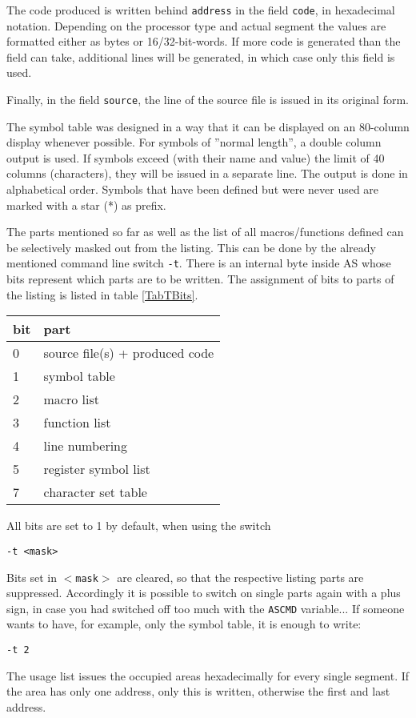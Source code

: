 \documentclass[12pt,twoside]{report}
\newcommand{\tty}[1]{{\tt #1}}
\newcommand{\asname}{{AS}}
\begin{document}
The code produced is written behind \tty{address} in the field \tty{code},
in hexadecimal notation. Depending on the processor type and actual
segment the values are formatted either as bytes or 16/32-bit-words.
If more code is generated than the field can take, additional lines
will be  generated, in which case only this field is used.

Finally, in the field \tty{source}, the line of the source file is issued in
its original form.

The symbol table was designed in a way that it can be displayed on an
80-column display whenever possible. For symbols of ''normal length'',
a double column output is used.  If symbols exceed (with their name
and value) the limit of 40 columns (characters), they will be issued
in a separate line. The output is done in alphabetical order.
Symbols that have been defined but were never used are marked with a
star (*) as prefix.

The parts mentioned so far as well as the list of all macros/functions
defined can be selectively masked out from the listing.
This can be done by the already mentioned command line switch \tty{-t}.
There is an internal byte inside \asname{} whose bits represent which parts
are to be written.  The assignment of bits to parts of the listing is
listed in table \ref{TabTBits}.
\par
\begin{table*}[htb]
\begin{center}\begin{tabular}{|l|l|}
\hline
bit &  part \\
\hline
\hline
0   & source file(s) + produced code \\
1   & symbol table \\
2   & macro list \\
3   & function list \\
4   & line numbering \\
5   & register symbol list \\
7   & character set table \\
\hline
\end{tabular}\end{center}
\caption{Assignment of Bits to Listing Components\label{TabTBits}}
\end{table*}
All bits are set to 1 by default, when using the switch
\begin{verbatim}
-t <mask>
\end{verbatim}
Bits set in \tty{$<$mask$>$} are cleared, so that the respective listing
parts are suppressed.  Accordingly it is possible to switch on single
parts again with a plus sign, in case you had switched off too much
with the \tty{ASCMD} variable... If someone wants to have, for example,
only the symbol table, it is enough to write:
\begin{verbatim}
-t 2
\end{verbatim}
The usage list issues the occupied areas hexadecimally for every
single segment.  If the area has only one address, only this is written,
otherwise the first and last address.
\end{document}
